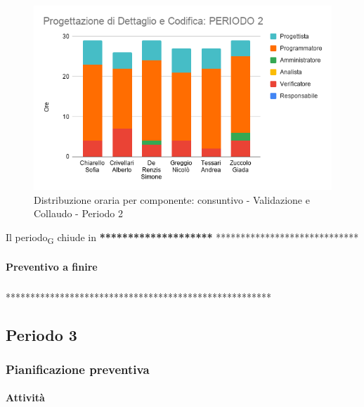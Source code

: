 \begin{figure}[H]
	\centering
	\includegraphics[scale=0.6]{res/images/charts/consuntivo/prog_dett_2.png}
	\caption{Distribuzione oraria per componente: consuntivo - Validazione e Collaudo - Periodo 2}
\end{figure}


Il periodo\textsubscript{G} chiude in \textbf{********************} *****************************


\paragraph{Preventivo a finire}
\subparagraph*{}

\pafTable{
	
}

******************************************************





\pagebreak
\subsection{Periodo 3}

\subsubsection{Pianificazione preventiva}

\paragraph{Attività}
\subparagraph*{}

\planningTable{
	
}

